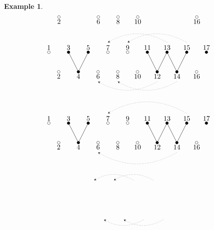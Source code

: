 \documentclass{amsart}
\newtheorem{example}[theorem]{Example}
\numberwithin{equation}{section}
\begin{document}
\begin{example}
\[\begin{tikzpicture}
          \foreach \i in {2,6,8,10,16}{
            \draw[fill=white] (0.5*\i,0) circle (2pt);
            \node[below] at (0.5*\i,0) {\i};}
        \end{tikzpicture}
      \]
      \[
        \begin{tikzpicture}
          \draw[dotted,-stealth] (6.5,1.5) to[out=150,in=30] (3.5,1.5);
          \draw[dotted,-stealth] (7.5,1.5) to[out=150,in=30] (4.5,1.5);
          \draw[dotted,-stealth] (6,-0.5) to[out=210,in=-30] (3,-0.5);
          \draw[dotted,-stealth] (7,-0.5) to[out=210,in=-30] (4,-0.5);
          \foreach \i in {3,5,11,13,15,17}{
            \draw[fill=black] (0.5*\i,1) circle (2pt);
            \node[above] at (0.5*\i,1) {\i};}
          \foreach \i in {1,7,9}{
            \draw[fill=white] (0.5*\i,1) circle (2pt);
            \node[above] at (0.5*\i,1) {\i};}
          \foreach \i in {4,12,14}{
            \draw[fill=black] (0.5*\i,0) circle (2pt);
            \draw (0.5*\i,0) -- (0.5*\i-0.5,1);
            \draw (0.5*\i,0) -- (0.5*\i+0.5,1);
            \node[below] at (0.5*\i,0) {\i};}
          \foreach \i in {2,6,8,10,16}{
            \draw[fill=white] (0.5*\i,0) circle (2pt);
            \node[below] at (0.5*\i,0) {\i};}
        \end{tikzpicture}
      \]
      \[
        \begin{tikzpicture}
          \draw[dotted,-stealth] (7.5,1.5) to[out=150,in=30] (3.5,1.5);
          \draw[dotted,-stealth] (7,-0.5) to[out=210,in=-30] (3,-0.5);
          \foreach \i in {3,5,11,13,15,17}{
            \draw[fill=black] (0.5*\i,1) circle (2pt);
            \node[above] at (0.5*\i,1) {\i};}
          \foreach \i in {1,7,9}{
            \draw[fill=white] (0.5*\i,1) circle (2pt);
            \node[above] at (0.5*\i,1) {\i};}
          \foreach \i in {4,12,14}{
            \draw[fill=black] (0.5*\i,0) circle (2pt);
            \draw (0.5*\i,0) -- (0.5*\i-0.5,1);
            \draw (0.5*\i,0) -- (0.5*\i+0.5,1);
            \node[below] at (0.5*\i,0) {\i};}
          \foreach \i in {2,6,8,10,16}{
            \draw[fill=white] (0.5*\i,0) circle (2pt);
            \node[below] at (0.5*\i,0) {\i};}
        \end{tikzpicture}
      \]
      \[
        \begin{tikzpicture}
          \draw[dotted,-stealth] (5.5,1.5) to[out=150,in=30] (3.5,1.5);
          \draw[dotted,-stealth] (6.5,1.5) to[out=150,in=30] (4.5,1.5);
          \draw[dotted,-stealth] (6,-0.5) to[out=210,in=-30] (4,-0.5);
          \draw[dotted,-stealth] (7,-0.5) to[out=210,in=-30] (5,-0.5);

\end{tikzpicture}\]
\end{example}
\end{document}
